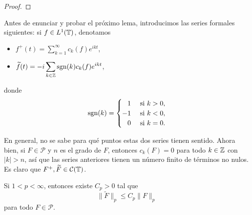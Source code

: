 \documentclass[a4paper, 12pt, oneside]{book}
\begin{document}
\begin{proof}
    
\end{proof}

Antes de enunciar y probar el próximo lema, introducimos las series formales siguientes: si $f\in L^1(\mathbb T)$, denotamos
\begin{itemize}
    \item $\displaystyle f^+(t) = \sum_{k=1}^\infty c_k(f)e^{ikt}$,
    \item $\displaystyle \widetilde{f}(t) = -i\sum_{k\in\mathbb Z} \textup{sgn}(k)c_k(f)e^{ikt}$,
\end{itemize}
donde
\[\sgn(k) = \begin{cases}
    \phantom{-}1 & $ si $ k > 0, \\
    -1 & $ si $ k < 0, \\
    \phantom{-}0 & $ si $ k = 0.
\end{cases}\]

En general, no se sabe para qué puntos estas dos series tienen sentido. Ahora bien, si $F \in \mathcal{P}$ y $n$ es el grado de $F$, entonces $c_k(F) = 0$ para todo $k\in\mathbb Z$ con $|k|>n$, así que las series anteriores tienen un número finito de términos no nulos. Es claro que $F^+, \widetilde{F}\in \mathcal{C}(\mathbb T)$.

\begin{lemma}
    Si $1 < p < \infty$, entonces existe $C_p > 0$ tal que
    \[\|\widetilde{F}\|_p \leq C_p \|F\|_{p}\]
    para todo $F \in \mathcal{P}$.
\end{lemma}
\end{document}
